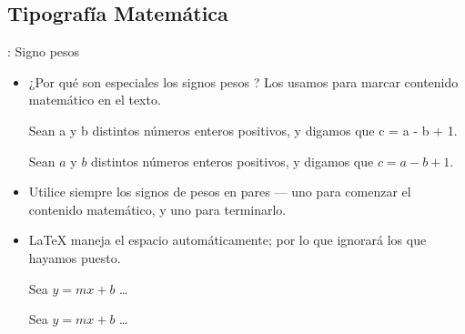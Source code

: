 \documentclass{beamer}
\begin{document}
\subsection{Tipografía Matemática}
\begin{frame}[fragile]{\insertsubsection{}: Signo pesos}
  \begin{itemize}
  \item ¿Por qué son especiales los signos pesos \keystrokebftt{\$}? Los
    usamos para marcar contenido  matemático en el texto.\\[1ex]
    \begin{exampletwouptiny}
Sean a y b distintos n\'umeros 
enteros positivos, y digamos 
que c = a - b + 1.
      
Sean $a$ y $b$ distintos n\'umeros
enteros positivos, y digamos 
que  $c = a - b + 1$.
    \end{exampletwouptiny}
  \item Utilice siempre los signos de pesos en pares --- uno para
    comenzar el contenido matemático, y uno para terminarlo.
  \item \LaTeX{} maneja el espacio automáticamente; por lo que
    ignorará los que hayamos puesto.
    \begin{exampletwouptiny}
Sea $y=mx+b$ \ldots
      
Sea $y = m x + b$ \ldots
    \end{exampletwouptiny}
  \end{itemize}
\end{frame}
\end{document}
